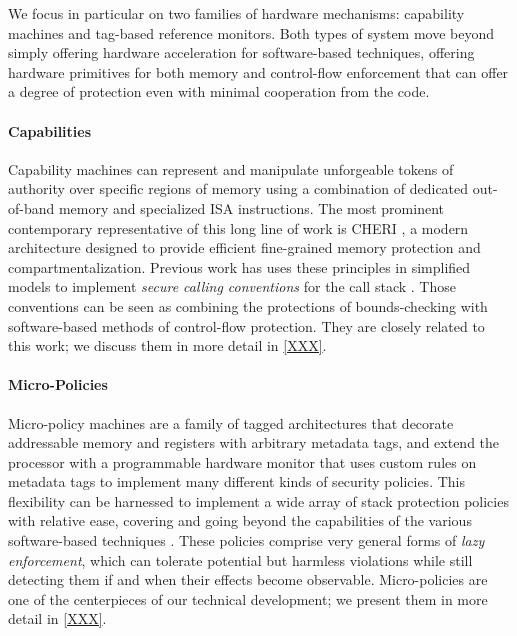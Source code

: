We focus in particular on two families of hardware mechanisms: capability machines
and tag-based reference monitors. Both types of system move beyond simply
offering hardware acceleration for software-based techniques, offering hardware
primitives for both memory and control-flow enforcement that can offer a degree
of protection even with minimal cooperation from the code.
%

\paragraph{Capabilities}
%

%
Capability machines can represent and manipulate
unforgeable tokens of authority over specific regions of
memory using a combination of dedicated out-of-band memory and
specialized ISA instructions.
%
The most prominent contemporary representative of this long line of work is
CHERI \cite{}, a modern architecture designed to provide efficient fine-grained
memory protection and compartmentalization.
%
Previous work has uses these principles in simplified models to implement
\emph{secure calling conventions} for the call
stack \cite{}. Those conventions can be seen as combining the
protections of bounds-checking with software-based methods of control-flow protection.
%
They are closely related  to this work; we discuss them in more
detail in \cref{XXX}.
%

\paragraph{Micro-Policies}
%
%
Micro-policy machines are a family of tagged architectures that decorate
addressable memory and registers with arbitrary metadata tags, and extend the
processor with a programmable hardware monitor that uses custom rules on
metadata tags to implement many different kinds of security policies.
%
This flexibility can be harnessed to implement a wide array of stack protection policies with relative ease, covering and going beyond the capabilities  of the various software-based techniques \cite{} .
%
These policies comprise very general forms of \emph{lazy enforcement}, which can tolerate
potential but harmless violations  while still detecting them if and when their effects
become observable. 
%
Micro-policies are one of the centerpieces of our technical development; we
present them in more detail in \cref{XXX}.

